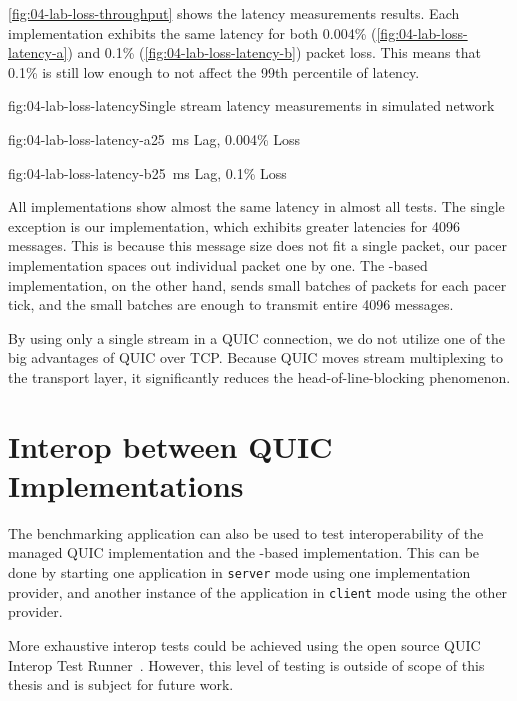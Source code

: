 \autoref{fig:04-lab-loss-throughput} shows the latency measurements results. Each implementation
exhibits the same latency for both 0.004\% (\autoref{fig:04-lab-loss-latency-a}) and 0.1\%
(\autoref{fig:04-lab-loss-latency-b}) packet loss. This means that 0.1\% is still low enough to not
affect the 99th percentile of latency.

\begin{myFigure}{fig:04-lab-loss-latency}{Single stream latency measurements in simulated network}
\begin{mySubfigure}{0.49\linewidth}{fig:04-lab-loss-latency-a}{\SI{25}{\milli\second} Lag, 0.004\% Loss}
\footnotesize

\end{mySubfigure}
\begin{mySubfigure}{0.49\linewidth}{fig:04-lab-loss-latency-b}{\SI{25}{\milli\second} Lag, 0.1\% Loss}
\footnotesize

\end{mySubfigure}
\end{myFigure}

All implementations show almost the same latency in almost all tests. The single exception is our
implementation, which exhibits greater latencies for \SI{4096}{\byte} messages. This is because this
message size does not fit a single packet, our pacer implementation spaces out individual packet one
by one. The \libmsquic{}-based implementation, on the other hand, sends small batches of packets for
each pacer tick, and the small batches are enough to transmit entire \SI{4096}{\byte} messages.

By using only a single stream in a QUIC connection, we do not utilize one of the big advantages of
QUIC over TCP\@. Because QUIC moves stream multiplexing to the transport layer, it significantly
reduces the \gls{head-of-line-blocking} phenomenon.

\section{Interop between QUIC Implementations}

The benchmarking application can also be used to test interoperability of the managed QUIC
implementation and the \libmsquic{}-based implementation. This can be done by starting one
application in \texttt{server} mode using one implementation provider, and another instance of the
application in \texttt{client} mode using the other provider.

More exhaustive interop tests could be achieved using the open source QUIC Interop Test
Runner~\cite{QuicInteropRunner}. However, this level of testing is outside of scope of this thesis
and is subject for future work.

